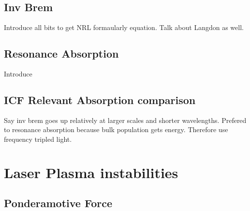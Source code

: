 \subsection{Inv Brem}%
\label{sec:theory_in_brem}

Introduce all bits to get NRL formaularly equation.
Talk about Langdon as well.

\subsection{Resonance Absorption}%
\label{sec:theory_res_abs}

Introduce

\subsection{ICF Relevant Absorption comparison}%
\label{sec:theory_absorption_comparison}

Say inv brem goes up relatively at larger scales and shorter wavelengths.
Prefered to resonance absorption because bulk population gets energy.
Therefore use frequency tripled light.

\section{Laser Plasma instabilities}%
\label{sec:theory_LPIs}

\subsection{Ponderamotive Force}%
\label{sec:theory_ponderamotive}

